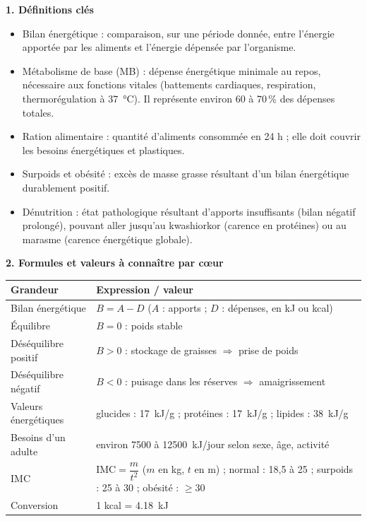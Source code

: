 \documentclass[11pt]{article}
\newcommand{\cle}[1]{{\popxbold\color{popdark}#1}}
\begin{document}
\begin{bilan}
\textbf{1. Définitions clés}
\begin{itemize}
  \item \cle{Bilan énergétique} : comparaison, sur une période donnée, entre l'\cle{énergie apportée} par les aliments et l'\cle{énergie dépensée} par l'organisme.
  \item \cle{Métabolisme de base (MB)} : dépense énergétique minimale au repos, nécessaire aux fonctions vitales (battements cardiaques, respiration, thermorégulation à \SI{37}{\celsius}). Il représente environ 60 à 70\,\% des dépenses totales.
  \item \cle{Ration alimentaire} : quantité d'aliments consommée en 24 h ; elle doit couvrir les besoins énergétiques et plastiques.
  \item \cle{Surpoids} et \cle{obésité} : excès de masse grasse résultant d'un bilan énergétique durablement positif.
  \item \cle{Dénutrition} : état pathologique résultant d'apports insuffisants (bilan négatif prolongé), pouvant aller jusqu'au \cle{kwashiorkor} (carence en protéines) ou au \cle{marasme} (carence énergétique globale).
\end{itemize}

\textbf{2. Formules et valeurs à connaître par cœur}

\begin{center}
\begin{tabularx}{\linewidth}{|l|X|}
\hline
\rowcolor{popblueL} \textbf{Grandeur} & \textbf{Expression / valeur} \\
\hline
Bilan énergétique & $B = A - D$ \quad ($A$ : apports ; $D$ : dépenses, en kJ ou kcal) \\
\hline
Équilibre & $B = 0$ : poids stable \\
\hline
Déséquilibre positif & $B > 0$ : stockage de graisses $\Rightarrow$ prise de poids \\
\hline
Déséquilibre négatif & $B < 0$ : puisage dans les réserves $\Rightarrow$ amaigrissement \\
\hline
Valeurs énergétiques & glucides : \SI{17}{kJ/g} ; protéines : \SI{17}{kJ/g} ; lipides : \SI{38}{kJ/g} \\
\hline
Besoins d'un adulte & environ \num{7500} à \SI{12500}{kJ/jour} selon sexe, âge, activité \\
\hline
IMC & $\mathrm{IMC} = \dfrac{m}{t^{2}}$ ($m$ en kg, $t$ en m) ; normal : 18,5 à 25 ; surpoids : 25 à 30 ; obésité : $\geq 30$ \\
\hline
Conversion & 1 kcal = \SI{4,18}{kJ} \\
\hline
\end{tabularx}
\end{center}


\end{bilan}
\end{document}
